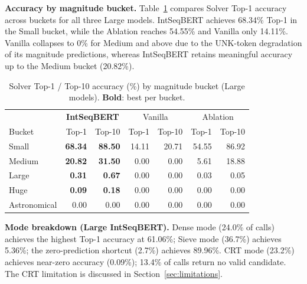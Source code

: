 \textbf{Accuracy by magnitude bucket.} Table~\ref{tab:solver-bucket} compares Solver
Top-1 accuracy across buckets for all three Large models. IntSeqBERT achieves 68.34\%
Top-1 in the Small bucket, while the Ablation reaches 54.55\% and Vanilla only 14.11\%.
Vanilla collapses to 0\% for Medium and above due to the UNK-token degradation of its
magnitude predictions, whereas IntSeqBERT retains meaningful accuracy up to the Medium
bucket (20.82\%).

\begin{table}[htbp]
\caption{Solver Top-1 / Top-10 accuracy (\%) by magnitude bucket (Large models).
         \textbf{Bold}: best per bucket.}
\label{tab:solver-bucket}
\centering
\begin{tabular}{l rr rr rr}
\hline
 & \multicolumn{2}{c}{\textbf{IntSeqBERT}} & \multicolumn{2}{c}{Vanilla} & \multicolumn{2}{c}{Ablation} \\
Bucket & Top-1 & Top-10 & Top-1 & Top-10 & Top-1 & Top-10 \\
\hline
Small        & \textbf{68.34} & \textbf{88.50} & 14.11 & 20.71 & 54.55 & 86.92 \\
Medium       & \textbf{20.82} & \textbf{31.50} &  0.00 &  0.00 &  5.61 & 18.88 \\
Large        & \textbf{ 0.31} & \textbf{ 0.67} &  0.00 &  0.00 &  0.03 &  0.05 \\
Huge         & \textbf{ 0.09} & \textbf{ 0.18} &  0.00 &  0.00 &  0.00 &  0.00 \\
Astronomical &  0.00          &  0.00          &  0.00 &  0.00 &  0.00 &  0.00 \\
\hline
\end{tabular}
\end{table}

\textbf{Mode breakdown (Large IntSeqBERT).} Dense mode (24.0\% of calls) achieves the highest
Top-1 accuracy at 61.06\%; Sieve mode (36.7\%) achieves 5.36\%; the zero-prediction shortcut
(2.7\%) achieves 89.96\%. CRT mode (23.2\%) achieves near-zero accuracy (0.09\%); 13.4\% of
calls return no valid candidate. The CRT limitation is discussed in Section~\ref{sec:limitations}.
